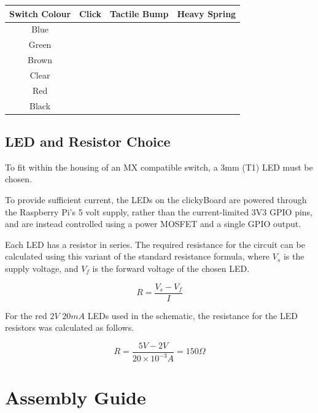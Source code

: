 \documentclass[10pt, a4paper, onesided]{article}
\begin{document}
	\begin{center}
	\begin{tabular}{c|c|c|c}
		Switch Colour & Click & Tactile Bump & Heavy Spring \\ 
		\hline 
		Blue & \checkmark & \checkmark & \\ 
		Green & \checkmark & \checkmark & \checkmark \\ 
		Brown &  & \checkmark & \\ 
		Clear &  & \checkmark & \checkmark \\ 
		Red &  &  & \\ 
		Black &  &  & \checkmark \\ 
	\end{tabular}
	\end{center}

	
	
	\subsection{LED and Resistor Choice}
	\label{LEDresistors}

	To fit within the housing of an MX compatible switch, a 3mm (T1) LED must be chosen.
	
	To provide sufficient current, the LEDs on the clickyBoard are powered through the Raspberry Pi's 5 volt supply, rather than the current-limited 3V3 GPIO pins, and are instead controlled using a power MOSFET and a single GPIO output.
	
	Each LED has a resistor in series. The required resistance for the circuit can be calculated using this variant of the standard resistance formula, where $V_s$ is the supply voltage, and $V_f$ is the forward voltage of the chosen LED.
	
	\begin{displaymath}
		R = \frac{V_s - V_f}{I}
	\end{displaymath}
	
	For the red $2 V$ $20 mA$ LEDs used in the schematic, the resistance for the LED resistors was calculated as follows.
	
	\begin{displaymath}
		R = \frac{5 V - 2 V}{20 \times 10^{-3} A} = 150 \Omega
	\end{displaymath}

\newpage
\section{Assembly Guide}
\end{document}

